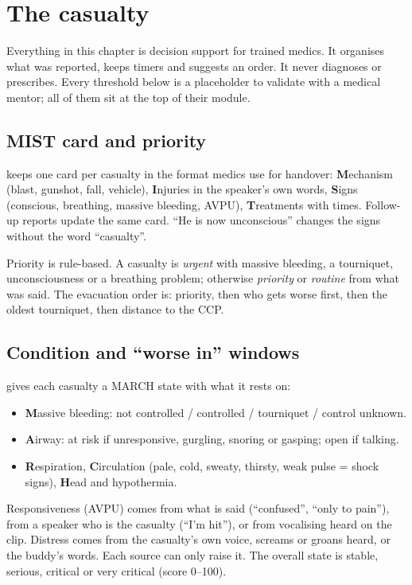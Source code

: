 \chapter{The casualty}\label{ch:casualty}

Everything in this chapter is decision support for trained medics. It organises what was reported, keeps
timers and suggests an order. It never diagnoses or prescribes. Every threshold below is a placeholder to
validate with a medical mentor; all of them sit at the top of their module.

\section{MIST card and priority}

 keeps one card per casualty in the format medics use for handover:
\textbf{M}echanism (blast, gunshot, fall, vehicle), \textbf{I}njuries in the speaker's own words,
\textbf{S}igns (conscious, breathing, massive bleeding, AVPU), \textbf{T}reatments with times. Follow-up
reports update the same card. ``He is now unconscious'' changes the signs without the word ``casualty''.

Priority is rule-based. A casualty is \emph{urgent} with massive bleeding, a tourniquet, unconsciousness
or a breathing problem; otherwise \emph{priority} or \emph{routine} from what was said. The evacuation order
is: priority, then who gets worse first, then the oldest tourniquet, then distance to the CCP.

\section{Condition and ``worse in'' windows}

 gives each casualty a MARCH state with what it rests on:
\begin{itemize}
  \item \textbf{M}assive bleeding: not controlled / controlled / tourniquet / control unknown.
  \item \textbf{A}irway: at risk if unresponsive, gurgling, snoring or gasping; open if talking.
  \item \textbf{R}espiration, \textbf{C}irculation (pale, cold, sweaty, thirsty, weak pulse = shock signs),
        \textbf{H}ead and hypothermia.
\end{itemize}
Responsiveness (AVPU) comes from what is said (``confused'', ``only to pain''), from a speaker who is the
casualty (``I'm hit''), or from vocalising heard on the clip. Distress comes from the casualty's own voice,
screams or groans heard, or the buddy's words. Each source can only raise it. The overall state is stable,
serious, critical or very critical (score 0--100).

